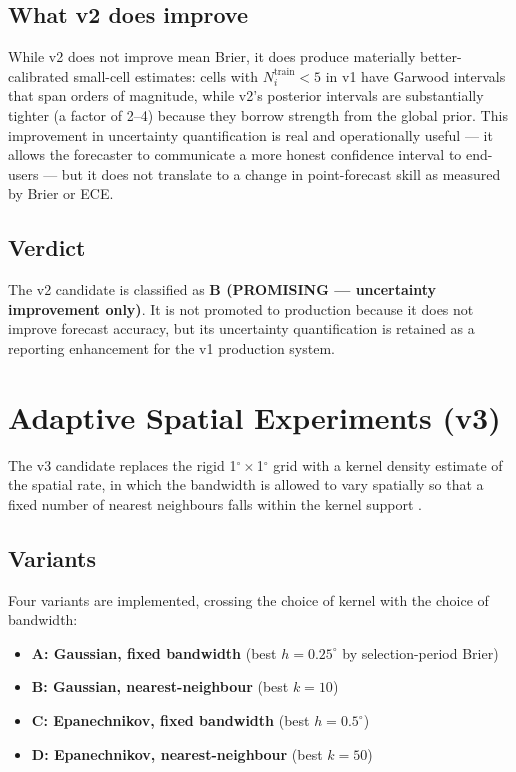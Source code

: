 \documentclass[10pt,a4paper,twocolumn]{article}
\begin{document}
\subsection{What v2 does improve}

While v2 does not improve mean Brier, it does produce materially better-calibrated small-cell estimates: cells with $N_i^{\text{train}}<5$ in v1 have Garwood intervals that span orders of magnitude, while v2's posterior intervals are substantially tighter (a factor of 2--4) because they borrow strength from the global prior. This improvement in uncertainty quantification is real and operationally useful --- it allows the forecaster to communicate a more honest confidence interval to end-users --- but it does not translate to a change in point-forecast skill as measured by Brier or ECE.

\subsection{Verdict}

The v2 candidate is classified as \textbf{B (PROMISING --- uncertainty improvement only)}. It is not promoted to production because it does not improve forecast accuracy, but its uncertainty quantification is retained as a reporting enhancement for the v1 production system.

\section{Adaptive Spatial Experiments (v3)}\label{sec:adaptive}

The v3 candidate replaces the rigid 1$^\circ\times$1$^\circ$ grid with a kernel density estimate of the spatial rate, in which the bandwidth is allowed to vary spatially so that a fixed number of nearest neighbours falls within the kernel support \cite{marsan2008, silverman1986}.

\subsection{Variants}

Four variants are implemented, crossing the choice of kernel with the choice of bandwidth:

\begin{itemize}[leftmargin=1.2em,itemsep=2pt,topsep=2pt]
\item \textbf{A: Gaussian, fixed bandwidth} (best $h=0.25^\circ$ by selection-period Brier)
\item \textbf{B: Gaussian, nearest-neighbour} (best $k=10$)
\item \textbf{C: Epanechnikov, fixed bandwidth} (best $h=0.5^\circ$)
\item \textbf{D: Epanechnikov, nearest-neighbour} (best $k=50$)
\end{itemize}
\end{document}
